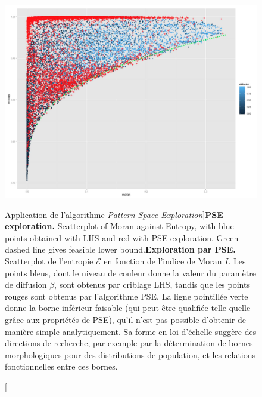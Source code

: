 \begin{figure}
\includegraphics[width=\linewidth]{Figures/Final/5-2-2-fig-density-fig6}
\caption[PSE exploration][Application de l'algorithme \emph{Pattern Space Exploration}]{\textbf{PSE exploration.} Scatterplot of Moran against Entropy, with blue points obtained with LHS and red with PSE exploration. Green dashed line gives feasible lower bound.\label{fig:density:fig6}}{\textbf{Exploration par PSE.} Scatterplot de l'entropie $\mathcal{E}$ en fonction de l'indice de Moran $I$. Les points bleus, dont le niveau de couleur donne la valeur du paramètre de diffusion $\beta$, sont obtenus par criblage LHS, tandis que les points rouges sont obtenus par l'algorithme PSE. La ligne pointillée verte donne la borne inférieur faisable (qui peut être qualifiée telle quelle grâce aux propriétés de PSE), qu'il n'est pas possible d'obtenir de manière simple analytiquement. Sa forme en loi d'échelle suggère des directions de recherche, par exemple par la détermination de bornes morphologiques pour des distributions de population, et les relations fonctionnelles entre ces bornes.\label{fig:density:fig6}}
\end{figure}


